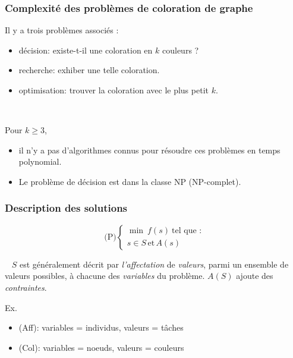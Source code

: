 \documentclass{beamer}
\begin{document}
\begin{frame}
  \frametitle{Complexité des problèmes de coloration de graphe}


  Il y a trois problèmes associés :
  \begin{itemize}
    \item décision:
      existe-t-il une coloration en $k$ couleurs ?
    \item recherche:
      exhiber une telle coloration.
    \item optimisation:
      trouver la coloration avec le plus petit $k$. %
  \end{itemize}

  ~
  
  Pour $k \geq 3$,
  \begin{itemize}
  \item il n'y a pas d'algorithmes connus pour
    résoudre ces problèmes en temps polynomial.
  \item Le problème de décision est dans la classe NP
    (NP-complet).
  \end{itemize}
\end{frame}

\begin{frame}
  \frametitle{Description des solutions}

  \[
  \text{(P)} \left\{
  \begin{array}{c}
    \min \ f(s) \ \text{tel que :} \\
    s \in S \, \text{et} \, A(s)
  \end{array}
  \right.
  \]

  \begin{block}{~}
  $S$ est généralement décrit par \emph{l'affectation} de \emph{valeurs}, parmi un ensemble de valeurs possibles, à chacune des \emph{variables} du problème. $A(S)$ ajoute des \emph{contraintes}.
  \end{block}
  
  \begin{block}{Ex. }
    \begin{itemize}
    \item (Aff): variables = individus, valeurs = tâches
    \item (Col): variables = noeuds, valeurs = couleurs
    \end{itemize}
  \end{block}
  
\end{frame}
\end{document}
